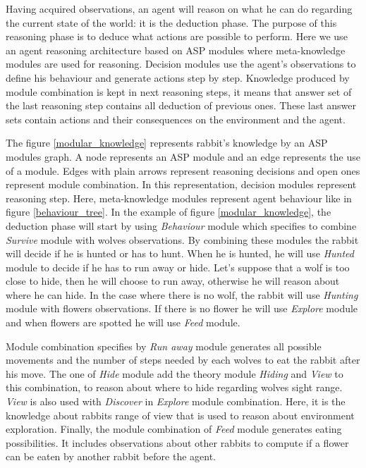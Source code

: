 \documentclass{aamas2012}
\begin{document}
	Having acquired observations, an agent will reason on what he can do regarding the current state of the world: it is the deduction phase.
	The purpose of this reasoning phase is to deduce what actions are possible to perform.
	Here we use an agent reasoning architecture based on ASP modules where meta-knowledge modules are used for reasoning.
	Decision modules use the agent's observations to define his behaviour and generate actions step by step.
	Knowledge produced by module combination is kept in next reasoning steps, 
	it means that answer set of the last reasoning step contains all deduction of previous ones.
	These last answer sets contain actions and their consequences on the environment and the agent.
	
	The figure \ref{modular_knowledge} represents rabbit's knowledge by an ASP modules graph.
	A node represents an ASP module and an edge represents the use of a module.
	Edges with plain arrows represent reasoning decisions and open ones represent module combination.
	In this representation, decision modules represent reasoning step.
	Here, meta-knowledge modules represent agent behaviour like in figure \ref{behaviour_tree}.
	In the example of figure \ref{modular_knowledge}, 
	the deduction phase will start by using \emph{Behaviour} module which specifies to combine \emph{Survive} module with wolves observations.
	By combining these modules the rabbit will decide if he is hunted or has to hunt.
	When he is hunted, he will use \emph{Hunted} module to decide if he has to run away or hide.
	Let's suppose that a wolf is too close to hide, then he will choose to run away, otherwise he will reason about where he can hide.
	In the case where there is no wolf, the rabbit will use \emph{Hunting} module with flowers observations.
	If there is no flower he will use \emph{Explore} module and when flowers are spotted he will use \emph{Feed} module.
	
	Module combination specifies by \emph{Run away} module generates all possible movements and the number of steps needed by each wolves to eat the rabbit after his move.
	The one of \emph{Hide} module add the theory module \emph{Hiding} and \emph{View} to this combination, to reason about where to hide regarding wolves sight range. 
	\emph{View} is also used with \emph{Discover} in \emph{Explore} module combination.
	Here, it is the knowledge about rabbits range of view that is used to reason about environment exploration.
	Finally, the module combination of \emph{Feed} module generates eating possibilities.
	It includes observations about other rabbits to compute if a flower can be eaten by another rabbit before the agent.
	
\end{document}
